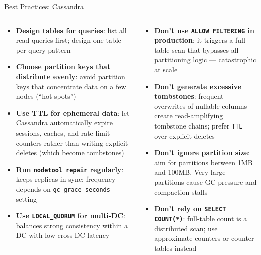 \documentclass[aspectratio=169]{beamer}
\begin{document}
\begin{frame}{Best Practices: Cassandra}
  \begin{columns}[T]
      \begin{tcolorbox}[cassbox, title={[OK] Do}]
        \small
        \begin{itemize}
          \item \textbf{Design tables for queries}: list all read queries first; design one table per query pattern
          \item \textbf{Choose partition keys that distribute evenly}: avoid partition keys that concentrate data on a few nodes (``hot spots'')
          \item \textbf{Use TTL for ephemeral data}: let Cassandra automatically expire sessions, caches, and rate-limit counters rather than writing explicit deletes (which become tombstones)
          \item \textbf{Run \texttt{nodetool repair} regularly}: keeps replicas in sync; frequency depends on \texttt{gc\_grace\_seconds} setting
          \item \textbf{Use \texttt{LOCAL\_QUORUM} for multi-DC}: balances strong consistency within a DC with low cross-DC latency
        \end{itemize}
      \end{tcolorbox}
      \begin{tcolorbox}[deepdivebox, title={[!] Don't}]
        \small
        \begin{itemize}
          \item \textbf{Don't use \texttt{ALLOW FILTERING} in production}: it triggers a full table scan that bypasses all partitioning logic — catastrophic at scale
          \item \textbf{Don't generate excessive tombstones}: frequent overwrites of nullable columns create read-amplifying tombstone chains; prefer \texttt{TTL} over explicit deletes
          \item \textbf{Don't ignore partition size}: aim for partitions between 1MB and 100MB. Very large partitions cause GC pressure and compaction stalls
          \item \textbf{Don't rely on \texttt{SELECT COUNT(*)}}: full-table count is a distributed scan; use approximate counters or counter tables instead
        \end{itemize}
      \end{tcolorbox}
  \end{columns}
\end{frame}
\end{document}
